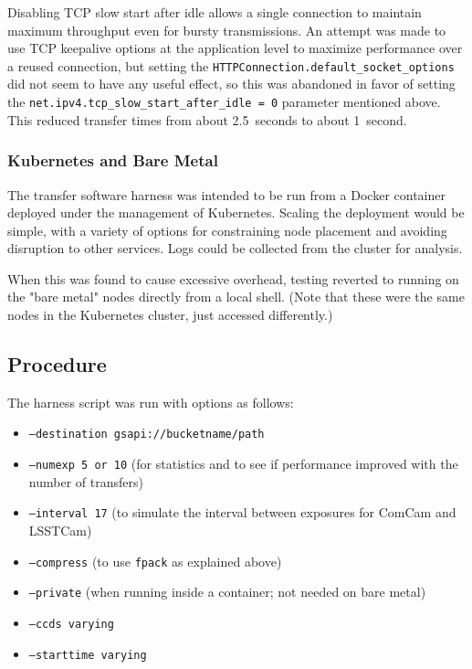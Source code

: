 Disabling TCP slow start after idle allows a single connection to maintain maximum throughput even for bursty transmissions.
An attempt was made to use TCP keepalive options at the application level to maximize performance over a reused connection, but setting the \texttt{HTTPConnection.default\_socket\_options} did not seem to have any useful effect, so this was abandoned in favor of setting the \texttt{net.ipv4.tcp\_slow\_start\_after\_idle = 0} parameter mentioned above.
This reduced transfer times from about 2.5~seconds to about 1~second.

\subsubsection{Kubernetes and Bare Metal}

The transfer software harness was intended to be run from a Docker container deployed under the management of Kubernetes.
Scaling the deployment would be simple, with a variety of options for constraining node placement and avoiding disruption to other services.
Logs could be collected from the cluster for analysis.

When this was found to cause excessive overhead, testing reverted to running on the "bare metal" nodes directly from a local shell.
(Note that these were the same nodes in the Kubernetes cluster, just accessed differently.)

\subsection{Procedure}

The harness script was run with options as follows:
\begin{itemize}
\item \texttt{--destination gsapi://bucketname/path}
\item \texttt{--numexp 5 or 10} (for statistics and to see if performance improved with the number of transfers)
\item \texttt{--interval 17} (to simulate the interval between exposures for ComCam and LSSTCam)
\item \texttt{--compress} (to use \texttt{fpack} as explained above)
\item \texttt{--private} (when running inside a container; not needed on bare metal)
\item \texttt{--ccds varying}
\item \texttt{--starttime varying}
\end{itemize}

